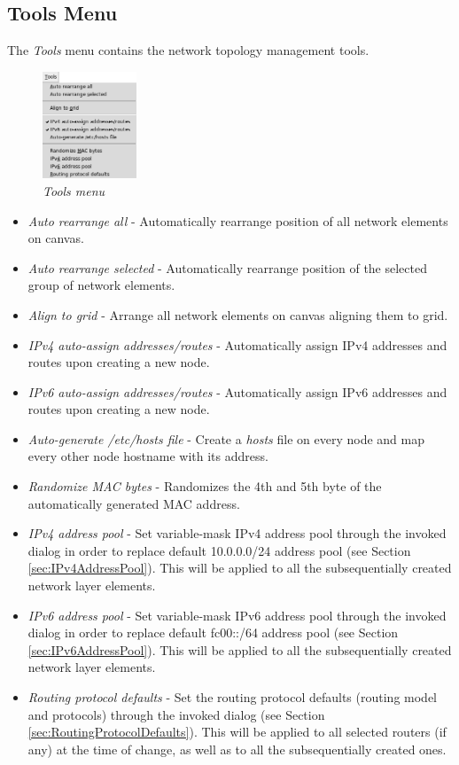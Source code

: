   \subsection{Tools Menu}
  The \emph{Tools} menu contains the network topology management tools.
  
  \begin{figure}[H]
  \centering
  \vspace{10pt}
  \includegraphics[width=0.25\textwidth]{./images/tools_menu.png}
  \caption{\emph{Tools menu}}
  \label{fig:tools_menu}
  \end{figure}
  
  \begin{itemize}
  \item \emph{Auto rearrange all} - Automatically rearrange position of all
network elements on canvas.
  \item \emph{Auto rearrange selected} - Automatically rearrange position of
the selected group of network elements.
  \item \emph{Align to grid} - Arrange all network elements on canvas aligning
them to grid.
  \item \emph{IPv4 auto-assign addresses/routes} - Automatically assign IPv4
addresses and routes upon creating a new node.
  \item \emph{IPv6 auto-assign addresses/routes} - Automatically assign IPv6
addresses and routes upon creating a new node.
  \item \emph{Auto-generate /etc/hosts file} - Create a \emph{hosts} file on
every node and map every other node hostname with its address.
  \item \emph{Randomize MAC bytes} - Randomizes the 4th and 5th byte of the
automatically generated MAC address.
  \item \emph{IPv4 address pool} - Set variable-mask IPv4 address pool through
the invoked dialog in order to replace default 10.0.0.0/24 address pool (see
Section \ref{sec:IPv4AddressPool}). This will be applied to all the
subsequentially created network layer elements. 
  \item \emph{IPv6 address pool} - Set variable-mask IPv6 address pool through
the invoked dialog in order to replace default fc00::/64 address pool (see
Section \ref{sec:IPv6AddressPool}). This will be applied to all the
subsequentially created network layer elements. 
  \item \emph{Routing protocol defaults} - Set the routing protocol defaults
(routing model and protocols) through the invoked dialog (see Section
\ref{sec:RoutingProtocolDefaults}). This will be applied to all selected
routers (if any) at the time of change, as well as to all the subsequentially
created ones.
  \end{itemize}
  

